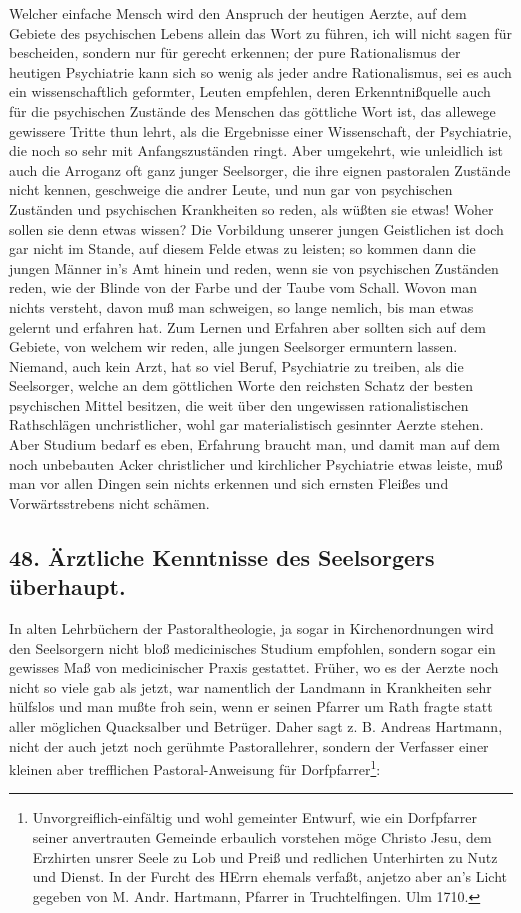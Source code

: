 Welcher einfache Mensch wird den Anspruch der heutigen Aerzte, auf dem Gebiete des psychischen Lebens allein das Wort zu führen, ich will nicht sagen für bescheiden, sondern nur für gerecht erkennen; der pure Rationalismus der heutigen Psychiatrie kann sich so wenig als jeder andre Rationalismus, sei es auch ein wissenschaftlich geformter, Leuten empfehlen,
deren Erkenntnißquelle auch für die psychischen Zustände des Menschen das göttliche Wort ist, das allewege gewissere Tritte thun lehrt, als die Ergebnisse einer Wissenschaft, der Psychiatrie, die noch so sehr mit Anfangszuständen ringt. Aber umgekehrt, wie unleidlich ist auch die Arroganz oft ganz junger Seelsorger, die ihre eignen pastoralen Zustände nicht kennen, geschweige die andrer Leute, und nun gar von psychischen Zuständen und psychischen Krankheiten so reden, als wüßten sie etwas! Woher sollen sie denn etwas wissen? Die Vorbildung unserer jungen Geistlichen ist doch gar nicht im Stande, auf diesem Felde etwas zu leisten; so kommen dann die jungen Männer in’s Amt hinein und reden, wenn sie von psychischen Zuständen reden, wie der Blinde von der Farbe und der Taube vom Schall. Wovon man nichts versteht, davon muß man schweigen, so lange nemlich, bis man etwas gelernt und erfahren hat. Zum Lernen und Erfahren aber sollten sich auf dem Gebiete, von welchem wir reden, alle jungen Seelsorger ermuntern lassen. Niemand, auch kein Arzt, hat so viel Beruf, Psychiatrie zu treiben, als die Seelsorger, welche an dem göttlichen Worte den reichsten Schatz der besten psychischen Mittel besitzen, die weit über den ungewissen rationalistischen Rathschlägen unchristlicher, wohl gar materialistisch gesinnter Aerzte stehen. Aber Studium bedarf es eben, Erfahrung braucht man, und damit man auf dem noch unbebauten Acker christlicher und kirchlicher Psychiatrie etwas leiste, muß man vor allen Dingen sein nichts erkennen und sich ernsten Fleißes und Vorwärtsstrebens nicht schämen.

\subsection*{48. Ärztliche Kenntnisse des Seelsorgers überhaupt.}

In alten Lehrbüchern der Pastoraltheologie, ja sogar in Kirchenordnungen wird den Seelsorgern nicht bloß medicinisches Studium empfohlen, sondern sogar ein gewisses Maß von medicinischer Praxis gestattet. Früher, wo es der Aerzte noch nicht so viele gab als jetzt, war namentlich der Landmann in Krankheiten sehr hülfslos und man mußte froh sein, wenn er seinen Pfarrer um Rath fragte statt aller möglichen Quacksalber und Betrüger. Daher sagt z. B. Andreas Hartmann, nicht der auch jetzt noch gerühmte Pastorallehrer, sondern der Verfasser einer kleinen aber trefflichen Pastoral-Anweisung für Dorfpfarrer\footnote{Unvorgreiflich-einfältig und wohl gemeinter Entwurf, wie ein Dorfpfarrer seiner anvertrauten Gemeinde erbaulich vorstehen möge Christo Jesu, dem Erzhirten unsrer Seele zu Lob und Preiß und redlichen Unterhirten zu Nutz und Dienst. In der Furcht des HErrn ehemals verfaßt, anjetzo aber an’s Licht gegeben von M. Andr. Hartmann, Pfarrer in Truchtelfingen. Ulm 1710.}:

